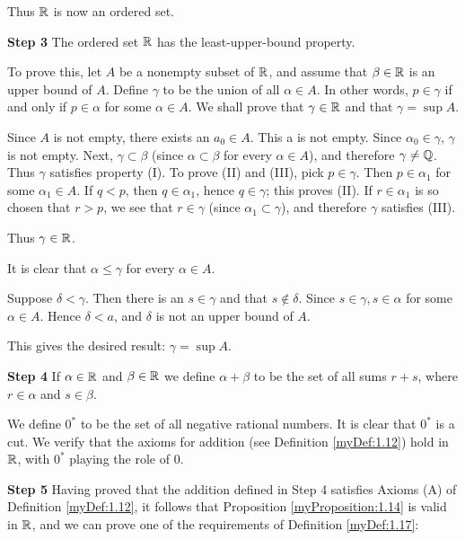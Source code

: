 Thus ${\protect\mathbb R}$ is now an ordered set.


\textbf{Step 3}
The ordered set ${\protect\mathbb R}$ has the least-upper-bound property.

To prove this, let $A$ be a nonempty subset of ${\protect\mathbb R}$, and assume that $\beta \in {\protect\mathbb R}$ is an upper bound of $A$. Define $\gamma$ to be the union of all $\alpha \in A$. In other words, $p\in \gamma$ if and only if $p \in \alpha$ for some $\alpha \in A$. We shall prove that $\gamma \in {\protect\mathbb R}$ and that $\gamma = \sup A$.

Since $A$ is not empty, there exists an $a_0 \in A$. This a is not empty. Since $\alpha_0 \in \gamma$, $\gamma$ is not empty. Next, $\gamma \subset \beta$ (since $\alpha \subset \beta$ for every $\alpha \in A$), and therefore $\gamma \neq {\protect\mathbb Q} $. Thus $\gamma$ satisfies property (I). To prove (II) and (III), pick $p \in \gamma$. Then $p \in \alpha_1$ for some $\alpha_1 \in A$. If $q <p$, then $q \in \alpha_1$, hence $q \in \gamma$; this proves (II). If $r \in \alpha_1$ is so chosen that $r > p$, we see that $r\in \gamma$ (since $\alpha_1 \subset \gamma$), and therefore $\gamma$
satisfies (III).

Thus $\gamma \in {\protect\mathbb R}$.

It is clear that $\alpha \leq \gamma$ for every $\alpha \in A$.

Suppose $\delta < \gamma$. Then there is an $s \in \gamma$ and that $s \not\in \delta$. Since $s \in \gamma, s \in \alpha$
for some $\alpha \in A$. Hence $\delta <a$, and $\delta$ is not an upper bound of $A$.

This gives the desired result: $\gamma = \sup A$.


\textbf{Step 4} If $\alpha \in {\protect\mathbb R}$ and $\beta \in {\protect\mathbb R}$ we define $\alpha + \beta$ to be the set of all sums $r + s$, where
$r \in \alpha$ and $s \in \beta$.

We define $0^*$ to be the set of all negative rational numbers. It is clear that $0^*$ is a cut. We verify that the axioms for addition (see Definition \ref{myDef:1.12}) hold in
${\protect\mathbb R}$, with $0^*$ playing the role of $0$.

\textbf{Step 5} Having proved that the addition defined in Step 4 satisfies Axioms (A) of Definition \ref{myDef:1.12}, it follows that Proposition \ref{myProposition:1.14} is valid in ${\protect\mathbb R}$, and we can
prove one of the requirements of Definition \ref{myDef:1.17}:


